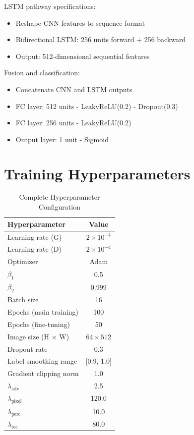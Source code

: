 \documentclass[journal]{IEEEtran}
\begin{document}
LSTM pathway specifications:
\begin{itemize}
    \item Reshape CNN features to sequence format
    \item Bidirectional LSTM: 256 units forward + 256 backward
    \item Output: 512-dimensional sequential features
\end{itemize}

Fusion and classification:
\begin{itemize}
    \item Concatenate CNN and LSTM outputs
    \item FC layer: 512 units - LeakyReLU(0.2) - Dropout(0.3)
    \item FC layer: 256 units - LeakyReLU(0.2)
    \item Output layer: 1 unit - Sigmoid
\end{itemize}

\section{Training Hyperparameters}


\begin{table}[!h]
\renewcommand{\arraystretch}{1.3}
\caption{Complete Hyperparameter Configuration}
\label{table_hyperparams}
\centering
\begin{tabular}{|l|c|}
\hline
\textbf{Hyperparameter} & \textbf{Value} \\
\hline
Learning rate (G) & $2 \times 10^{-4}$ \\
Learning rate (D) & $2 \times 10^{-4}$ \\
Optimizer & Adam \\
$\beta_1$ & 0.5 \\
$\beta_2$ & 0.999 \\
Batch size & 16 \\
Epochs (main training) & 100 \\
Epochs (fine-tuning) & 50 \\
Image size (H × W) & $64 \times 512$ \\
Dropout rate & 0.3 \\
Label smoothing range & [0.9, 1.0] \\
Gradient clipping norm & 1.0 \\
$\lambda_{\text{adv}}$ & 2.5 \\
$\lambda_{\text{pixel}}$ & 120.0 \\
$\lambda_{\text{perc}}$ & 10.0 \\
$\lambda_{\text{rec}}$ & 80.0 \\
\hline
\end{tabular}
\end{table}
\end{document}
